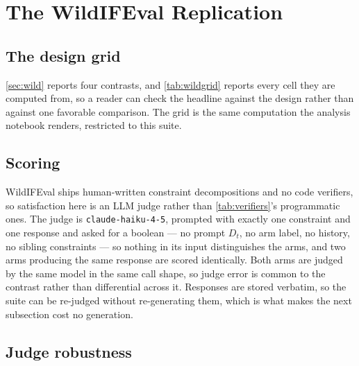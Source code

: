 
\section{The WildIFEval Replication}
\label{sec:appendix:wild}

\subsection{The design grid}
\label{sec:appendix:wildgrid}



\autoref{sec:wild} reports four contrasts, and \autoref{tab:wildgrid} reports every cell they are
computed from, so a reader can check the headline against the design rather than against one
favorable comparison. The grid is the same computation the analysis notebook renders, restricted
to this suite.

\subsection{Scoring}
\label{sec:appendix:wildscoring}

WildIFEval ships human-written constraint decompositions and no code verifiers,
so satisfaction here is an LLM judge rather than \autoref{tab:verifiers}'s programmatic ones. The judge
is \texttt{claude-haiku-4-5}, prompted with exactly one constraint and one response and asked for a
boolean --- no prompt $D_t$, no arm label, no history, no sibling constraints --- so nothing in its input
distinguishes the arms, and two arms producing the same response are scored identically. Both arms are
judged by the same model in the same call shape, so judge error is common to the contrast rather than
differential across it. Responses are stored verbatim, so the suite can be re-judged without
re-generating them, which is what makes the next subsection cost no generation.

\subsection{Judge robustness}
\label{sec:appendix:judges}



